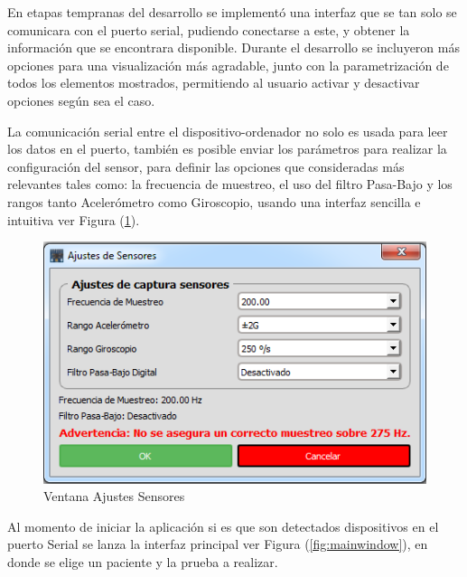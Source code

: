 \documentclass[12pt,a4paper]{article}
\begin{document}
En etapas tempranas del desarrollo se implementó una interfaz que se tan solo se comunicara con el puerto serial, pudiendo conectarse a este, y obtener la información que se encontrara disponible.
Durante el desarrollo se incluyeron más opciones para una visualización más agradable, junto con la parametrización de todos los elementos mostrados, permitiendo al usuario activar y desactivar opciones según sea el caso.

La comunicación serial entre el dispositivo-ordenador no solo es usada para leer los datos en el puerto, también es posible enviar los parámetros para realizar la configuración del sensor, para definir las opciones que consideradas más relevantes tales como: la frecuencia de muestreo, el uso del filtro Pasa-Bajo y los rangos tanto Acelerómetro como Giroscopio, usando una interfaz sencilla e intuitiva ver Figura (\ref{fig:ajustessensores}).

\begin{figure}[H]
	\centering
	\includegraphics[scale=0.6]{images/ajustesSensores}
	\caption{Ventana Ajustes Sensores}
	\label{fig:ajustessensores}
\end{figure}

Al momento de iniciar la aplicación si es que son detectados dispositivos en el puerto Serial se lanza la interfaz principal ver Figura (\ref{fig:mainwindow}), en donde se elige un paciente y la prueba a realizar.
\end{document}
